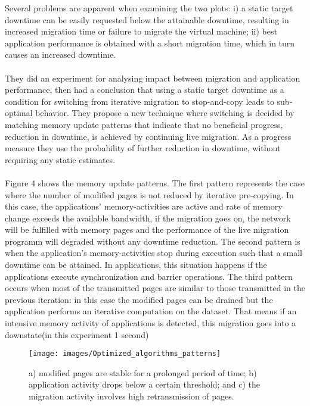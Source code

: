 \documentclass[runningheads]{llncs}
\begin{document}
Several problems are apparent when examining the two plots: i) a static target downtime can be easily requested below the attainable downtime, resulting in increased migration time or failure to migrate the virtual machine; ii) best application performance is obtained with a short migration time, which in turn causes an increased downtime.
\\\\
They did an experiment for analysing impact between migration and application performance, then had a conclusion that using a static target downtime as a condition for switching from iterative migration to stop-and-copy leads to sub-optimal behavior\cite{ibrahim2011optimized}. They propose a new technique where switching is decided by matching memory update patterns that indicate that no beneficial progress, reduction in downtime, is achieved by continuing live migration. As a progress measure they use the probability of further reduction in downtime, without requiring any static estimates.
\\\\
Figure 4 shows the memory update patterns. The first pattern represents the case where the number of modified pages is not reduced by iterative pre-copying. In this case, the applications' memory-activities are active and rate of memory change exceeds the available bandwidth, if the migration goes on, the network will be fulfilled with memory pages and the performance of the live migration programm will degraded without any downtime reduction. The second pattern is when the application’s memory-activities stop during execution such that a small downtime can be attained. In applications, this situation happens if the applications execute synchronization and barrier operations. The third pattern occurs when most of the transmitted pages are similar to those transmitted in the previous iteration: in this case the modified pages can be drained but the application performs an iterative computation on the dataset. That means if an intensive memory activity of applications is detected, this migration goes into a downstate(in this experiment 1 second)
\begin{figure}
\centering
\texttt{[image: images/Optimized\_algorithms\_patterns]}
\caption{a) modified pages are stable for a prolonged period of time; b) application activity drops below a certain threshold; and c) the migration activity involves high retransmission of pages. }
\end{figure}
\\\\
\end{document}
